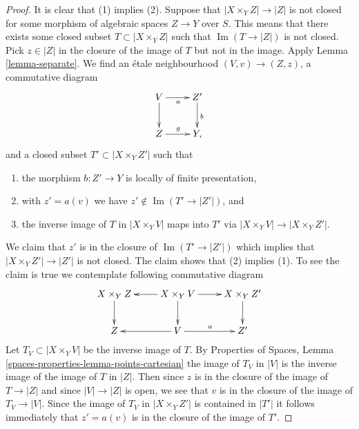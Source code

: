 \documentclass{stacks-project}
\theoremstyle{plain}
\theoremstyle{definition}
\theoremstyle{remark}
\numberwithin{equation}{subsection}
\def\Im{\mathop{\mathrm{Im}}}
\begin{document}
\begin{proof}
It is clear that (1) implies (2).
Suppose that $|X \times_Y Z| \to |Z|$ is not closed for some
morphism of algebraic spaces $Z \to Y$ over $S$. This means that there
exists some closed subset $T \subset |X \times_Y Z|$
such that $\Im(T \to |Z|)$ is not closed. Pick $z \in |Z|$
in the closure of the image of $T$ but not in the image.
Apply Lemma \ref{lemma-separate}.
We find an \'etale neighbourhood $(V, v) \to (Z, z)$, a commutative diagram
$$
\xymatrix{
V \ar[d] \ar[r]_a & Z' \ar[d]^b \\
Z \ar[r]^g & Y,
}
$$
and a closed subset $T' \subset |X \times_Y Z'|$ such that
\begin{enumerate}
\item the morphism $b : Z' \to Y$ is locally of finite presentation,
\item with $z' = a(v)$ we have $z' \not \in \Im(T' \to |Z'|)$, and
\item the inverse image of $T$ in $|X \times_Y V|$ maps into $T'$ via
$|X \times_Y V| \to |X \times_Y Z'|$.
\end{enumerate}
We claim that $z'$ is in the closure of $\Im(T' \to |Z'|)$
which implies that $|X \times_Y Z'| \to |Z'|$ is not closed.
The claim shows that (2) implies (1).
To see the claim is true we contemplate
following commutative diagram
$$
\xymatrix{
X \times_Y Z \ar[d] &
X \times_Y V \ar[l] \ar[d] \ar[r] &
X \times_Y Z' \ar[d] \\
Z & V \ar[l] \ar[r]^a & Z'
}
$$
Let $T_V \subset |X \times_Y V|$ be the inverse image of $T$.
By Properties of Spaces, Lemma \ref{spaces-properties-lemma-points-cartesian}
the image of $T_V$ in $|V|$ is the inverse image of the image
of $T$ in $|Z|$. Then since $z$ is in the closure of the image of
$T \to |Z|$ and since $|V| \to |Z|$ is open, we see that $v$ is in
the closure of the image of $T_V \to |V|$. Since the image of
$T_V$ in $|X \times_Y Z'|$ is contained in $|T'|$ it follows
immediately that $z' = a(v)$ is in the closure of the image of $T'$.


\end{proof}
\end{document}
